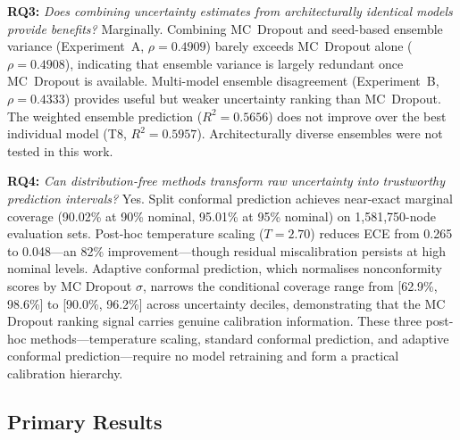 \textbf{RQ3:} \emph{Does combining uncertainty estimates from architecturally identical models provide benefits?} Marginally.  Combining MC~Dropout and seed-based ensemble variance (Experiment~A, $\rho = 0.4909$) barely exceeds MC~Dropout alone ($\rho = 0.4908$), indicating that ensemble variance is largely redundant once MC~Dropout is available.  Multi-model ensemble disagreement (Experiment~B, $\rho = 0.4333$) provides useful but weaker uncertainty ranking than MC~Dropout.  The weighted ensemble prediction ($R^2 = 0.5656$) does not improve over the best individual model (T8, $R^2 = 0.5957$).  Architecturally diverse ensembles were not tested in this work.

\textbf{RQ4:} \emph{Can distribution-free methods transform raw uncertainty into trustworthy prediction intervals?} Yes. Split conformal prediction achieves near-exact marginal coverage (90.02\% at 90\% nominal, 95.01\% at 95\% nominal) on 1,581,750-node evaluation sets. Post-hoc temperature scaling ($T = 2.70$) reduces ECE from 0.265 to 0.048---an 82\% improvement---though residual miscalibration persists at high nominal levels. Adaptive conformal prediction, which normalises nonconformity scores by MC Dropout $\sigma$, narrows the conditional coverage range from [62.9\%, 98.6\%] to [90.0\%, 96.2\%] across uncertainty deciles, demonstrating that the MC Dropout ranking signal carries genuine calibration information. These three post-hoc methods---temperature scaling, standard conformal prediction, and adaptive conformal prediction---require no model retraining and form a practical calibration hierarchy.

\subsection{Primary Results}

